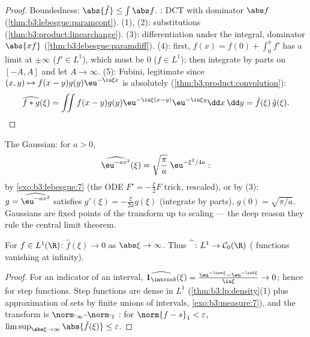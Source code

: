 \begin{proof}
Boundedness: $\abs{\hat f} \leq \int\abs f$. : DCT
with dominator $\abs f$ (\cref{thm:b3:lebesgue:paramcont}).
(1), (2): substitutions
(\cref{thm:b3:product:linearchange}). (3): differentiation
under the integral, dominator $\abs{xf}$
(\cref{thm:b3:lebesgue:paramdiff}). (4): first, $f(x) = f(0)
+ \int_0^xf'$ has a limit at $\pm\infty$ ($f' \in L^1$), which
must be $0$ ($f \in L^1$); then integrate by parts on $[-A,
A]$ and let $A \to \infty$. (5): Fubini, legitimate since
$(x,y)\mapsto f(x - y)g(y)\eu^{-\iu\xi x}$ is absolutely
 (\cref{thm:b3:product:convolution}):
\[
\widehat{f*g}(\xi) = \iint f(x - y)g(y)\eu^{-\iu\xi(x - y)}
\eu^{-\iu\xi y}\dd x\,\dd y = \hat f(\xi)\,\hat g(\xi).
\]
\end{proof}

\begin{example}\label{ex:b3:fouriertransform:gaussian}
The Gaussian: for $a > 0$,
\[
\widehat{\eu^{-ax^2}}(\xi) =
\sqrt{\frac\pi a}\;\eu^{-\xi^2/4a} :
\]
by \cref{exo:b3:lebesgue:7} (the ODE $F' = -\frac\xi{2}F$
trick, rescaled), or by (3): $g = \widehat{\eu^{-ax^2}}$
satisfies $g'(\xi) = -\frac{\xi}{2a}g(\xi)$ (integrate by
parts), $g(0) = \sqrt{\pi/a}$. Gaussians are fixed points of
the transform up to scaling --- the deep reason they rule the
central limit theorem.
\end{example}

\begin{theorem}
\label{thm:b3:fouriertransform:riemannlebesgue}
For $f \in L^1(\R)$: $\hat f(\xi) \to 0$ as $\abs\xi \to
\infty$. Thus $\widehat{\phantom f} \colon L^1 \to \mathcal
C_0(\R)$ ( functions vanishing at
infinity).
\end{theorem}

\begin{proof}
For an indicator of an interval, $\widehat{\mathbf 1_{\intcc
ab}}(\xi) = \frac{\eu^{-\iu a\xi} - \eu^{-\iu b\xi}}{\iu\xi}
\to 0$; hence for step functions. Step functions are dense in
$L^1$ (\cref{thm:b3:lp:density}(1) plus approximation of
 sets by finite unions of intervals,
\cref{exo:b3:measure:7}), and the transform is
$\norm\cdot_\infty$-$\norm\cdot_1$ : for $\norm{f -
s}_1 < \varepsilon$, $\limsup_{\abs\xi\to\infty}\abs{\hat
f(\xi)} \leq \varepsilon$.
\end{proof}

